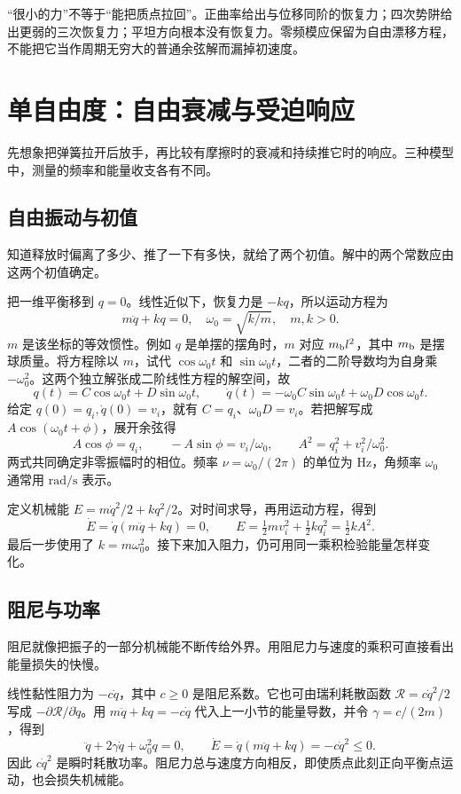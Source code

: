 \begin{physicsbox}
“很小的力”不等于“能把质点拉回”。正曲率给出与位移同阶的恢复力；四次势阱给出更弱的三次恢复力；平坦方向根本没有恢复力。零频模应保留为自由漂移方程，不能把它当作周期无穷大的普通余弦解而漏掉初速度。
\end{physicsbox}

\section{单自由度：自由衰减与受迫响应}
先想象把弹簧拉开后放手，再比较有摩擦时的衰减和持续推它时的响应。三种模型中，测量的频率和能量收支各有不同。

\subsection{自由振动与初值}
知道释放时偏离了多少、推了一下有多快，就给了两个初值。解中的两个常数应由这两个初值确定。

把一维平衡移到 $q=0$。线性近似下，恢复力是 $-kq$，所以运动方程为
\begin{equation}
m\ddot q+kq=0,\quad \omega_0=\sqrt{k/m},\quad m,k>0.
\label{eq:sho}
\end{equation}
$m$ 是该坐标的等效惯性。例如 $q$ 是单摆的摆角时，$m$ 对应 $m_{\rm b}l^2$，其中 $m_{\rm b}$ 是摆球质量。将方程除以 $m$，试代 $\cos\omega_0t$ 和 $\sin\omega_0t$，二者的二阶导数均为自身乘 $-\omega_0^2$。这两个独立解张成二阶线性方程的解空间，故
\[
q(t)=C\cos\omega_0t+D\sin\omega_0t,\qquad
\dot q(t)=-\omega_0 C\sin\omega_0t+\omega_0 D\cos\omega_0t .
\]
给定 $q(0)=q_i,\dot q(0)=v_i$，就有 $C=q_i$、$\omega_0D=v_i$。若把解写成 $A\cos(\omega_0t+\phi)$，展开余弦得
\[
A\cos\phi=q_i,\qquad -A\sin\phi=v_i/\omega_0,\qquad
A^2=q_i^2+v_i^2/\omega_0^2 .
\]
两式共同确定非零振幅时的相位。频率 $\nu=\omega_0/(2\pi)$ 的单位为 Hz，角频率 $\omega_0$ 通常用 $\mathrm{rad/s}$ 表示。

定义机械能 $E=m\dot q^2/2+kq^2/2$。对时间求导，再用运动方程，得到
\[
\dot E=\dot q(m\ddot q+kq)=0,\qquad
E=\tfrac12mv_i^2+\tfrac12kq_i^2=\tfrac12kA^2 .
\]
最后一步使用了 $k=m\omega_0^2$。接下来加入阻力，仍可用同一乘积检验能量怎样变化。

\subsection{阻尼与功率}
阻尼就像把振子的一部分机械能不断传给外界。用阻尼力与速度的乘积可直接看出能量损失的快慢。

线性黏性阻力为 $-c\dot q$，其中 $c\ge0$ 是阻尼系数。它也可由瑞利耗散函数 $\mathcal R=c\dot q^2/2$ 写成 $-\partial\mathcal R/\partial\dot q$。用 $m\ddot q+kq=-c\dot q$ 代入上一小节的能量导数，并令 $\gamma=c/(2m)$，得到
\begin{equation}
\ddot q+2\gamma\dot q+\omega_0^2q=0,\qquad
\dot E=\dot q(m\ddot q+kq)=-c\dot q^2\le0.
\label{eq:damped-osc}
\end{equation}
因此 $c\dot q^2$ 是瞬时耗散功率。阻尼力总与速度方向相反，即使质点此刻正向平衡点运动，也会损失机械能。

